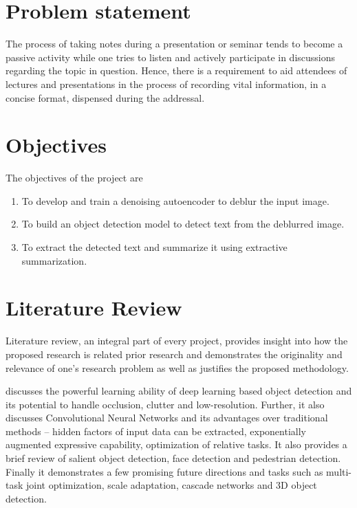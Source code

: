 \section[Problem statement]{\textbf{Problem statement}}

The process of taking notes during a presentation or seminar tends to become a passive activity while one tries to listen and actively participate in discussions regarding the topic in question. Hence, there is a requirement to aid attendees of lectures and presentations in the process of recording vital information, in a concise format, dispensed during the addressal.


\section[Objectives]{\textbf{Objectives}}
The objectives of the project are
\begin{enumerate}
\item To develop and train a denoising autoencoder to deblur the input image.
\item To build an object detection model to detect text from the deblurred image.
\item To extract the detected text and summarize it using extractive summarization.
\end{enumerate}

\section[Literature Review]{\textbf{Literature Review}}

Literature review, an integral part of every project, provides insight into how the proposed research is related prior research and demonstrates the originality and relevance of one's research problem as well as justifies the proposed methodology. 

\cite{8627998} discusses the powerful learning ability of deep learning based object detection and its potential to handle occlusion, clutter and low-resolution. Further, it also discusses Convolutional Neural Networks and its advantages over traditional methods -- hidden factors of input data can be extracted, exponentially augmented expressive capability, optimization of relative tasks. It also provides a brief review of salient object detection, face detection and pedestrian detection. Finally it demonstrates a few promising future directions and tasks such as multi-task joint optimization, scale adaptation, cascade networks and 3D object detection.

